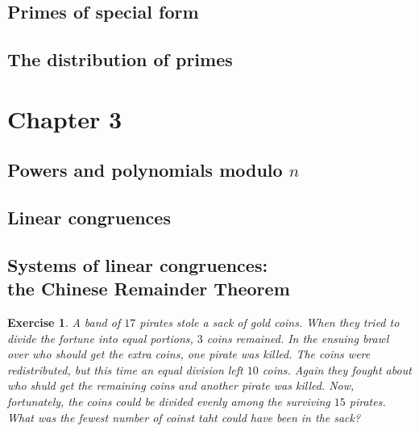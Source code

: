 \documentclass{article}
\newtheorem{ex}[thm]{Exercise}
\numberwithin{equation}{thm}
\begin{document}



\subsection*{Primes of special form}




\subsection*{The distribution of primes}





\pagebreak



\section{Chapter 3}


\subsection*{Powers and polynomials modulo $n$}




\subsection*{Linear congruences}




\subsection*{Systems of linear congruences: \\ the Chinese Remainder Theorem}


\begin{ex} \label{3.25}
  A band of $17$ pirates stole a sack of gold coins. When they tried to divide the fortune into equal portions, $3$ coins remained. In the ensuing brawl over who should get the extra coins, one pirate was killed. The coins were redistributed, but this time an equal division left $10$ coins. Again they fought about who shuld get the remaining coins and another pirate was killed. Now, fortunately, the coins could be divided evenly among the surviving $15$ pirates. What was the fewest number of coinst taht could have been in the sack?
\end{ex}
\end{document}
